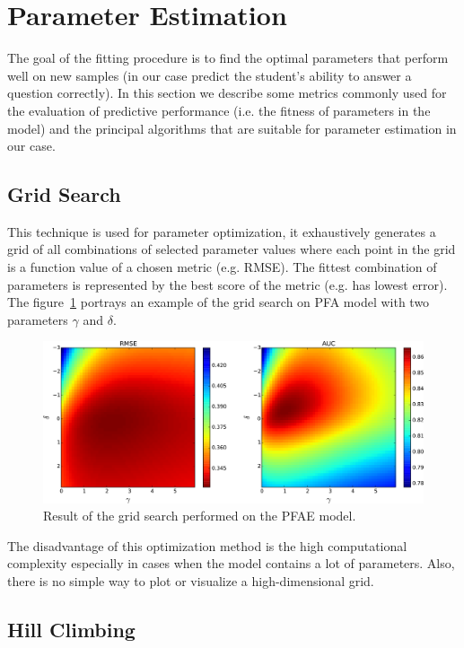 \section{Parameter Estimation}

The goal of the fitting procedure is to find the optimal parameters that perform well on new samples (in our case predict the student's ability to answer a question correctly). In this section we describe some metrics commonly used for the evaluation of predictive performance (i.e. the fitness of parameters in the model) and the principal algorithms that are suitable for parameter estimation in our case.

\subsection{Grid Search}

This technique is used for parameter optimization, it exhaustively generates a grid of all combinations of selected parameter values where each point in the grid is a function value of a chosen metric (e.g. RMSE). The fittest combination of parameters is represented by the best score of the metric (e.g. has lowest error). The figure~\ref{fig-grid-search-rmse-auc} portrays an example of the grid search on PFA model with two parameters $\gamma$ and $\delta$.

\begin{figure}[htbp]
  \centering
  \includegraphics[width=\textwidth]{img/pfa-grid-search-rmse-auc}
  \caption{Result of the grid search performed on the PFAE model.}
  \label{fig-grid-search-rmse-auc}
\end{figure}

The disadvantage of this optimization method is the high computational complexity especially in cases when the model contains a lot of parameters. Also, there is no simple way to plot or visualize a high-dimensional grid.

\subsection{Hill Climbing}
\label{hill-climbing}

